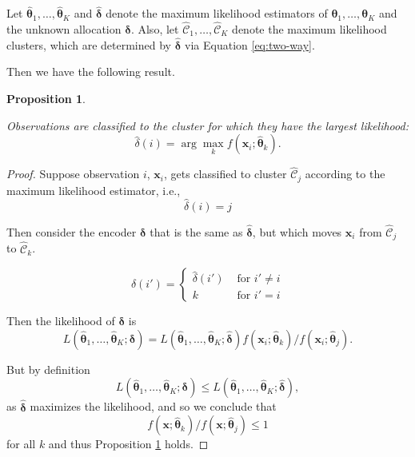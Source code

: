 \documentclass[
]{book}
\newtheorem{proposition}{Proposition}[chapter]
\theoremstyle{definition}
\theoremstyle{definition}
\theoremstyle{definition}
\theoremstyle{definition}
\theoremstyle{remark}
\begin{document}
Let \(\hat{\boldsymbol \theta}_1, \ldots , \hat{\boldsymbol \theta}_K\) and \(\hat{\boldsymbol \delta}\) denote the maximum likelihood estimators of \(\boldsymbol \theta_1, \ldots , \boldsymbol \theta_K\) and the unknown allocation \(\boldsymbol \delta\).
Also, let \(\hat{\mathcal{C}}_1, \ldots, \hat{\mathcal{C}}_K\) denote the maximum likelihood clusters, which are determined by \(\hat{\boldsymbol \delta}\) via Equation \eqref{eq:two-way}.

Then we have the following result.

\begin{proposition}
\protect\hypertarget{prp:ten1}{}\label{prp:ten1}

Observations are classified to the cluster for which they have the largest likelihood:
\[\hat{\delta}(i)= \arg \max_k f(\mathbf x_i; \hat{\boldsymbol \theta}_k).\]

\end{proposition}

\begin{proof}
Suppose observation \(i\), \(\mathbf x_i\), gets classified to cluster \(\hat{\mathcal{C}}_j\) according to the maximum likelihood estimator, i.e.,
\[\hat{\delta}(i)=j\]

Then consider the encoder \(\boldsymbol \delta\) that is the same as \(\hat{\boldsymbol \delta}\), but which moves \(\mathbf x_i\) from \(\hat{\mathcal{C}}_j\) to \(\hat{\mathcal{C}}_k\).

\[\delta(i') =\begin{cases}
\hat{\delta}(i') &\mbox{ for } i' \not = i\\
 k & \mbox{ for } i' = i
\end{cases}\]

Then the likelihood of \(\boldsymbol \delta\) is
\[
L(\hat{\boldsymbol \theta}_1, \ldots , \hat{\boldsymbol \theta}_K; \boldsymbol \delta) = L(\hat{\boldsymbol \theta}_1, \ldots , \hat{\boldsymbol \theta}_K; \hat{\boldsymbol \delta})f(\mathbf x_i; \hat{\boldsymbol \theta}_k)/f(\mathbf x_i; \hat{\boldsymbol \theta}_j).
\]

But by definition
\[
L(\hat{\boldsymbol \theta}_1, \ldots , \hat{\boldsymbol \theta}_K; \boldsymbol \delta) \leq L(\hat{\boldsymbol \theta}_1, \ldots , \hat{\boldsymbol \theta}_K; \hat{\boldsymbol \delta}),
\]
as \(\hat{\boldsymbol \delta}\) maximizes the likelihood, and so we conclude that
\[f(\mathbf x; \hat{\boldsymbol \theta}_k)/f(\mathbf x; \hat{\boldsymbol \theta}_j)\leq1\]
for all \(k\)
and thus Proposition \ref{prp:ten1} holds.
\end{proof}
\end{document}
